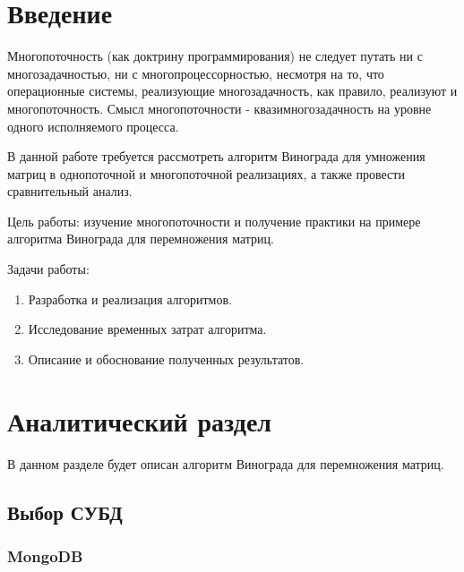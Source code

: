 \documentclass[12pt, a4paper]{report}
\begin{document}
	
	\tableofcontents

	\chapter*{Введение}
	
	\vspace{-0.5cm}\hspace{0.6cm}Многопоточность (как доктрину программирования) не следует путать ни с многозадачностью, ни с многопроцессорностью, несмотря на то, что операционные системы, реализующие многозадачность, как правило, реализуют и многопоточность. Смысл многопоточности - квазимногозадачность на уровне одного исполняемого процесса\cite{Volkova}\cite{thread}.
		
	\vspace{0.3cm}В данной работе требуется рассмотреть алгоритм Винограда для умножения матриц в однопоточной и многопоточной реализациях, а также провести сравнительный анализ.
	
		\vspace{0.3cm}Цель работы: изучение многопоточности и получение практики на примере алгоритма Винограда для перемножения матриц.
	
		\vspace{0.3cm}Задачи работы:
	\begin{enumerate}
		\item Разработка и реализация алгоритмов.
		\item Исследование временных затрат алгоритма.
		\item Описание и обоснование полученных результатов.
	\end{enumerate}
	

    \chapter{Аналитический раздел}
    
   	\vspace{-0.5cm}\hspace{0.6cm}В данном разделе будет описан алгоритм Винограда для перемножения матриц.
   	
   	
	\section{Выбор СУБД}
	
	\subsection{MongoDB}
	
\end{document}
